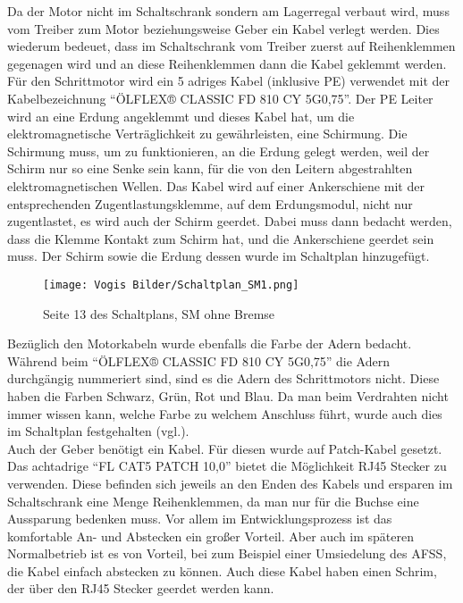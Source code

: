     Da der Motor nicht im Schaltschrank sondern am Lagerregal verbaut wird, muss vom Treiber zum Motor beziehungsweise Geber ein Kabel verlegt werden. Dies wiederum bedeuet, dass im Schaltschrank vom Treiber zuerst auf Reihenklemmen gegenagen wird und an diese Reihenklemmen dann die Kabel geklemmt werden. Für den Schrittmotor wird ein 5 adriges Kabel (inklusive PE) verwendet mit der Kabelbezeichnung \enquote{ÖLFLEX® CLASSIC FD 810 CY 5G0,75}. Der PE Leiter wird an eine Erdung angeklemmt und dieses Kabel hat, um die elektromagnetische Verträglichkeit zu gewährleisten, eine Schirmung. Die Schirmung muss, um zu funktionieren, an die Erdung gelegt werden, weil der Schirm nur so eine Senke sein kann, für die von den Leitern abgestrahlten elektromagnetischen Wellen. Das Kabel wird auf einer Ankerschiene mit der entsprechenden Zugentlastungsklemme, auf dem Erdungsmodul, nicht nur zugentlastet, es wird auch der Schirm geerdet. Dabei muss dann bedacht werden, dass die Klemme Kontakt zum Schirm hat, und die Ankerschiene geerdet sein muss. Der Schirm sowie die Erdung dessen wurde im Schaltplan hinzugefügt.\\    
    \begin{figure}[h]
        \centering
        \texttt{[image: Vogis Bilder/Schaltplan\_SM1.png]}
        \caption{Seite 13 des Schaltplans, SM ohne Bremse}
        \label{fig:SMohneBremse}
    \end{figure}
    Bezüglich den Motorkabeln wurde ebenfalls die Farbe der Adern bedacht. Während beim \enquote{ÖLFLEX® CLASSIC FD 810 CY 5G0,75} die Adern durchgängig nummeriert sind, sind es die Adern des Schrittmotors nicht. Diese haben die Farben Schwarz, Grün, Rot und Blau. Da man beim Verdrahten nicht immer wissen kann, welche Farbe zu welchem Anschluss führt, wurde auch dies im Schaltplan festgehalten (vgl.\cite{Nema_SM_Kontaktbezeichnung}).\\
    Auch der Geber benötigt ein Kabel. Für diesen wurde auf Patch-Kabel gesetzt. Das achtadrige \enquote{FL CAT5 PATCH 10,0} bietet die Möglichkeit RJ45 Stecker zu verwenden. Diese befinden sich jeweils an den Enden des Kabels und ersparen im Schaltschrank eine Menge Reihenklemmen, da man nur für die Buchse eine Aussparung bedenken muss. Vor allem im Entwicklungsprozess ist das komfortable An- und Abstecken ein großer Vorteil. Aber auch im späteren Normalbetrieb ist es von Vorteil, bei zum Beispiel einer Umsiedelung des AFSS, die Kabel einfach abstecken zu können. Auch diese Kabel haben einen Schrim, der über den RJ45 Stecker geerdet werden kann.\\\\
